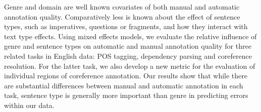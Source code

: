Genre and domain are well known covariates of both manual and automatic annotation quality. Comparatively less is known about the effect of sentence types, such as imperatives, questions or fragments, and how they interact with text type effects. Using mixed effects models, we evaluate the relative influence of genre and sentence types on automatic and manual annotation quality for three related tasks in English data: POS tagging, dependency parsing and coreference resolution. For the latter task, we also develop a new metric for the evaluation of individual regions of coreference annotation. Our results show that while there are substantial differences between manual and automatic annotation in each task, sentence type is generally more important than genre in predicting errors within our data.
